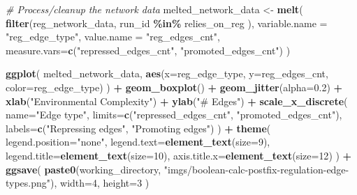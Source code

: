 \documentclass[
]{book}
\newenvironment{Shaded}{\begin{snugshade}}{\end{snugshade}}
\newcommand{\CommentTok}[1]{\textcolor[rgb]{0.56,0.35,0.01}{\textit{#1}}}
\newcommand{\DataTypeTok}[1]{\textcolor[rgb]{0.13,0.29,0.53}{#1}}
\newcommand{\DecValTok}[1]{\textcolor[rgb]{0.00,0.00,0.81}{#1}}
\newcommand{\FloatTok}[1]{\textcolor[rgb]{0.00,0.00,0.81}{#1}}
\newcommand{\KeywordTok}[1]{\textcolor[rgb]{0.13,0.29,0.53}{\textbf{#1}}}
\newcommand{\NormalTok}[1]{#1}
\newcommand{\OperatorTok}[1]{\textcolor[rgb]{0.81,0.36,0.00}{\textbf{#1}}}
\newcommand{\StringTok}[1]{\textcolor[rgb]{0.31,0.60,0.02}{#1}}
\begin{document}
\begin{Shaded}
\begin{Highlighting}[]
\CommentTok{\# Process/cleanup the network data}
\NormalTok{melted\_network\_data \textless{}{-}}\StringTok{ }\KeywordTok{melt}\NormalTok{(}
  \KeywordTok{filter}\NormalTok{(reg\_network\_data,}
\NormalTok{         run\_id }\OperatorTok{\%in\%}\StringTok{ }\NormalTok{relies\_on\_reg}
\NormalTok{        ),}
  \DataTypeTok{variable.name =} \StringTok{"reg\_edge\_type"}\NormalTok{,}
  \DataTypeTok{value.name =} \StringTok{"reg\_edges\_cnt"}\NormalTok{,}
  \DataTypeTok{measure.vars=}\KeywordTok{c}\NormalTok{(}\StringTok{"repressed\_edges\_cnt"}\NormalTok{, }\StringTok{"promoted\_edges\_cnt"}\NormalTok{)}
\NormalTok{)}

\KeywordTok{ggplot}\NormalTok{( melted\_network\_data, }\KeywordTok{aes}\NormalTok{(}\DataTypeTok{x=}\NormalTok{reg\_edge\_type, }\DataTypeTok{y=}\NormalTok{reg\_edges\_cnt, }\DataTypeTok{color=}\NormalTok{reg\_edge\_type) ) }\OperatorTok{+}
\StringTok{  }\KeywordTok{geom\_boxplot}\NormalTok{() }\OperatorTok{+}
\StringTok{  }\KeywordTok{geom\_jitter}\NormalTok{(}\DataTypeTok{alpha=}\FloatTok{0.2}\NormalTok{) }\OperatorTok{+}
\StringTok{  }\KeywordTok{xlab}\NormalTok{(}\StringTok{"Environmental Complexity"}\NormalTok{) }\OperatorTok{+}
\StringTok{  }\KeywordTok{ylab}\NormalTok{(}\StringTok{"\# Edges"}\NormalTok{) }\OperatorTok{+}
\StringTok{  }\KeywordTok{scale\_x\_discrete}\NormalTok{(}
    \DataTypeTok{name=}\StringTok{"Edge type"}\NormalTok{,}
    \DataTypeTok{limits=}\KeywordTok{c}\NormalTok{(}\StringTok{"repressed\_edges\_cnt"}\NormalTok{, }\StringTok{"promoted\_edges\_cnt"}\NormalTok{),}
    \DataTypeTok{labels=}\KeywordTok{c}\NormalTok{(}\StringTok{"Repressing edges"}\NormalTok{, }\StringTok{"Promoting edges"}\NormalTok{)}
\NormalTok{  ) }\OperatorTok{+}
\StringTok{  }\KeywordTok{theme}\NormalTok{(}
    \DataTypeTok{legend.position=}\StringTok{"none"}\NormalTok{,}
    \DataTypeTok{legend.text=}\KeywordTok{element\_text}\NormalTok{(}\DataTypeTok{size=}\DecValTok{9}\NormalTok{),}
    \DataTypeTok{legend.title=}\KeywordTok{element\_text}\NormalTok{(}\DataTypeTok{size=}\DecValTok{10}\NormalTok{),}
    \DataTypeTok{axis.title.x=}\KeywordTok{element\_text}\NormalTok{(}\DataTypeTok{size=}\DecValTok{12}\NormalTok{)}
\NormalTok{  ) }\OperatorTok{+}
\StringTok{  }\KeywordTok{ggsave}\NormalTok{(}
    \KeywordTok{paste0}\NormalTok{(working\_directory, }\StringTok{"imgs/boolean{-}calc{-}postfix{-}regulation{-}edge{-}types.png"}\NormalTok{),}
    \DataTypeTok{width=}\DecValTok{4}\NormalTok{,}
    \DataTypeTok{height=}\DecValTok{3}
\NormalTok{  )}
\end{Highlighting}
\end{Shaded}
\end{document}
